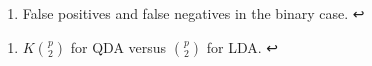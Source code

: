 \documentclass[11pt]{article}
\providecommand{\tightlist}{%
      \setlength{\itemsep}{0pt}\setlength{\parskip}{0pt}}
\begin{document}
\hypertarget{foot29}{}
\begin{enumerate}
\def\labelenumi{\arabic{enumi}.}
\setcounter{enumi}{28}
\tightlist
\item
  False positives and false negatives in the binary case. ↩
\end{enumerate}

\hypertarget{foot30}{}
\begin{enumerate}
\def\labelenumi{\arabic{enumi}.}
\setcounter{enumi}{29}
\tightlist
\item
  \(K\binom{p}{2}\) for QDA versus \(\binom{p}{2}\) for LDA. ↩
\end{enumerate}


    
    
    
    
\end{document}
